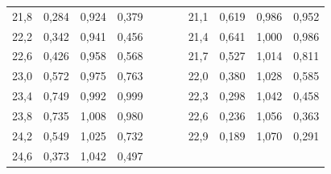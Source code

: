 \documentclass{article}
\begin{document}
\begin{center}
\begin{tabular}{|l|l|l|l|lllllll}
    21,8                        & 0,284                    & 0,924                       & 0,379                       &  &  & \multicolumn{1}{l|}{} & \multicolumn{1}{l|}{21,1}  & \multicolumn{1}{l|}{0,619} & \multicolumn{1}{l|}{0,986}  & \multicolumn{1}{l|}{0,952}  \\ \cline{1-4} \cline{8-11} 
    22,2                        & 0,342                    & 0,941                       & 0,456                       &  &  & \multicolumn{1}{l|}{} & \multicolumn{1}{l|}{21,4}  & \multicolumn{1}{l|}{0,641} & \multicolumn{1}{l|}{1,000}  & \multicolumn{1}{l|}{0,986}  \\ \cline{1-4} \cline{8-11} 
    22,6                        & 0,426                    & 0,958                       & 0,568                       &  &  & \multicolumn{1}{l|}{} & \multicolumn{1}{l|}{21,7}  & \multicolumn{1}{l|}{0,527} & \multicolumn{1}{l|}{1,014}  & \multicolumn{1}{l|}{0,811}  \\ \cline{1-4} \cline{8-11} 
    23,0                        & 0,572                    & 0,975                       & 0,763                       &  &  & \multicolumn{1}{l|}{} & \multicolumn{1}{l|}{22,0}  & \multicolumn{1}{l|}{0,380} & \multicolumn{1}{l|}{1,028}  & \multicolumn{1}{l|}{0,585}  \\ \cline{1-4} \cline{8-11} 
    23,4                        & 0,749                    & 0,992                       & 0,999                       &  &  & \multicolumn{1}{l|}{} & \multicolumn{1}{l|}{22,3}  & \multicolumn{1}{l|}{0,298} & \multicolumn{1}{l|}{1,042}  & \multicolumn{1}{l|}{0,458}  \\ \cline{1-4} \cline{8-11} 
    23,8                        & 0,735                    & 1,008                       & 0,980                       &  &  & \multicolumn{1}{l|}{} & \multicolumn{1}{l|}{22,6}  & \multicolumn{1}{l|}{0,236} & \multicolumn{1}{l|}{1,056}  & \multicolumn{1}{l|}{0,363}  \\ \cline{1-4} \cline{8-11} 
    24,2                        & 0,549                    & 1,025                       & 0,732                       &  &  & \multicolumn{1}{l|}{} & \multicolumn{1}{l|}{22,9}  & \multicolumn{1}{l|}{0,189} & \multicolumn{1}{l|}{1,070}  & \multicolumn{1}{l|}{0,291}  \\ \cline{1-4} \cline{8-11} 
    24,6                        & 0,373                    & 1,042                       & 0,497                       &  &  &                       &                            &                            &                             &                             \\ \cline{1-4}

\end{tabular}
\end{center}
\end{document}
